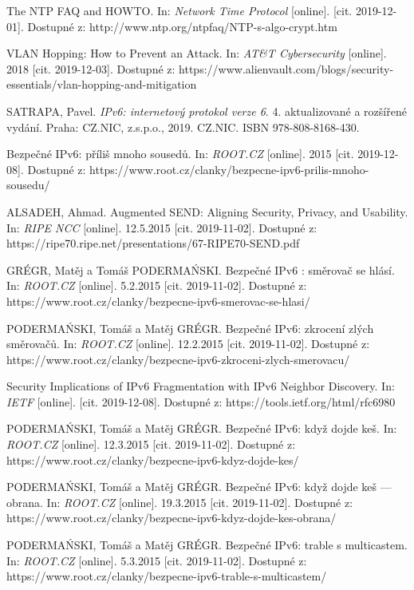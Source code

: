 \begin{literatura}{99}
The NTP FAQ and HOWTO. In: \textit{Network Time Protocol} [online]. [cit. 2019-12-01]. Dostupné z: http://www.ntp.org/ntpfaq/NTP-s-algo-crypt.htm

VLAN Hopping: How to Prevent an Attack. In: \textit{AT\&T Cybersecurity} [online]. 2018 [cit. 2019-12-03]. Dostupné z: https://www.alienvault.com/blogs/security-essentials/vlan-hopping-and-mitigation

SATRAPA, Pavel. \textit{IPv6: internetový protokol verze 6}. 4. aktualizované a rozšířené vydání. Praha: CZ.NIC, z.s.p.o., 2019. CZ.NIC. ISBN 978-808-8168-430.

Bezpečné IPv6: příliš mnoho sousedů. In: \textit{ROOT.CZ} [online]. 2015 [cit. 2019-12-08]. Dostupné z: https://www.root.cz/clanky/bezpecne-ipv6-prilis-mnoho-
sousedu/

ALSADEH, Ahmad. Augmented SEND: Aligning Security, Privacy, and Usability. In: \textit{RIPE NCC} [online]. 12.5.2015 [cit. 2019-11-02]. Dostupné z: https://ripe70.ripe.net/presentations/67-RIPE70-SEND.pdf

GRÉGR, Matěj a Tomáš PODERMAŃSKI. Bezpečné IPv6 : směrovač se hlásí. In: \textit{ROOT.CZ} [online]. 5.2.2015 [cit. 2019-11-02]. Dostupné z: https://www.root.cz/clanky/bezpecne-ipv6-smerovac-se-hlasi/

PODERMAŃSKI, Tomáš a Matěj GRÉGR. Bezpečné IPv6: zkrocení zlých směrovačů. In: \textit{ROOT.CZ} [online]. 12.2.2015 [cit. 2019-11-02]. Dostupné z: https://www.root.cz/clanky/bezpecne-ipv6-zkroceni-zlych-smerovacu/

Security Implications of IPv6 Fragmentation with IPv6 Neighbor Discovery. In: \textit{IETF} [online]. [cit. 2019-12-08]. Dostupné z: https://tools.ietf.org/html/rfc6980
	

PODERMAŃSKI, Tomáš a Matěj GRÉGR. Bezpečné IPv6: když dojde keš. In: \textit{ROOT.CZ} [online]. 12.3.2015 [cit. 2019-11-02]. Dostupné z: https://www.root.cz/clanky/bezpecne-ipv6-kdyz-dojde-kes/

PODERMAŃSKI, Tomáš a Matěj GRÉGR. Bezpečné IPv6: když dojde keš --- obrana. In: \textit{ROOT.CZ} [online]. 19.3.2015 [cit. 2019-11-02]. Dostupné z: https://www.root.cz/clanky/bezpecne-ipv6-kdyz-dojde-kes-obrana/



PODERMAŃSKI, Tomáš a Matěj GRÉGR. Bezpečné IPv6: trable s multicastem. In: \textit{ROOT.CZ} [online]. 5.3.2015 [cit. 2019-11-02]. Dostupné z: https://www.root.cz/clanky/bezpecne-ipv6-trable-s-multicastem/


\end{literatura}
